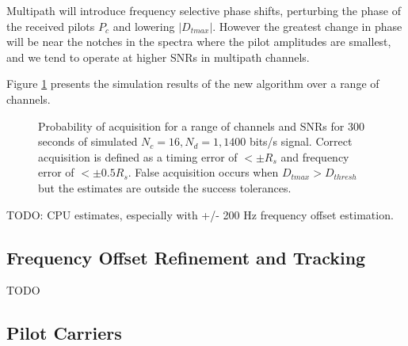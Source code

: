 \documentclass{article}
\begin{document}
Multipath will introduce frequency selective phase shifts, perturbing the phase of the received pilots $P_c$ and lowering $|D_{tmax}|$.  However the greatest change in phase will be near the notches in the spectra where the pilot amplitudes are smallest, and we tend to operate at higher SNRs in multipath channels.

Figure \ref{fig:acq_curves} presents the simulation results of the new algorithm over a range of channels.

\begin{figure}[H]
\caption{Probability of acquisition for a range of channels and SNRs for 300 seconds of simulated $N_c=16, N_d=1, 1400$ bits/s signal. Correct acquisition is defined as a timing error of $< \pm R_s$ and frequency error of $< \pm 0.5R_s$.  False acquisition occurs when $D_{tmax} > D_{thresh}$ but the estimates are outside the success tolerances.}
\label{fig:acq_curves}
\begin{center}

\end{center}
\end{figure}

TODO: CPU estimates, especially with +/- 200 Hz frequency offset estimation.

\subsection{Frequency Offset Refinement and Tracking}

TODO

\subsection{Pilot Carriers}
\end{document}
